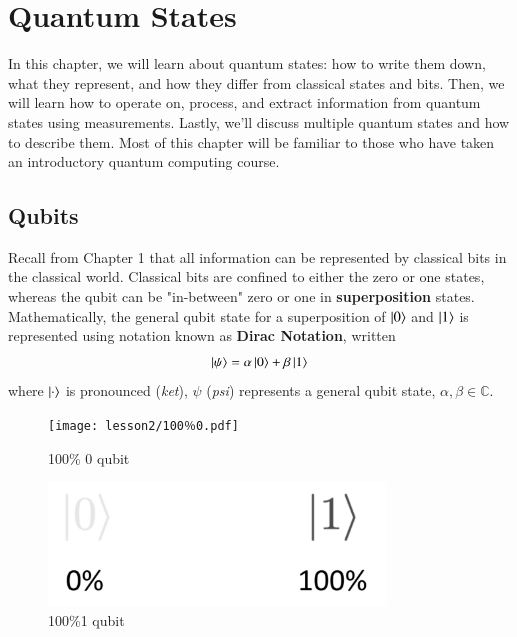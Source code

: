 \chapter[Quantum States]{Quantum States}
\label{sec:2_quantum_states}




In this chapter, we will learn about quantum states: how to write them down, what they represent, and how they differ from classical states and bits.
Then, we will learn how to operate on, process, and extract information from quantum states using measurements. Lastly, we'll discuss multiple quantum states and how to describe them.  Most of this chapter will be familiar to those who have taken an introductory quantum computing course.


\section{Qubits}


Recall from Chapter 1 that all information can be represented by classical bits in the classical world. Classical bits are confined to either the zero or one states, whereas the qubit can be "in-between" zero or one in  \textbf{superposition} states. Mathematically, the general qubit state for a superposition of $\left| 0 \right\rangle$ and $\left| 1 \right\rangle$ is represented using notation known as \textbf{Dirac Notation}, written
\begin{equation}
\left| \psi \right\rangle = \alpha \left| 0 \right\rangle + \beta\left| 1 \right\rangle 
\end{equation}
 where $\left| \cdot \right\rangle$ is pronounced (\emph{ket}), $\psi$ (\emph{psi}) represents a general qubit state, $\alpha,\beta \in \mathbb{C}$.

\begin{figure}[H]
    \centering
    \texttt{[image: lesson2/100％0.pdf]}
        \caption{100\% 0 qubit}
    \label{fig:100-zero}
\end{figure}

\begin{figure}[H]
    \centering
    \includegraphics[width=0.8\textwidth]{lesson2/100_1.pdf}
    
        \caption{100\%1 qubit}
    
    \label{fig:100-one}
\end{figure}


